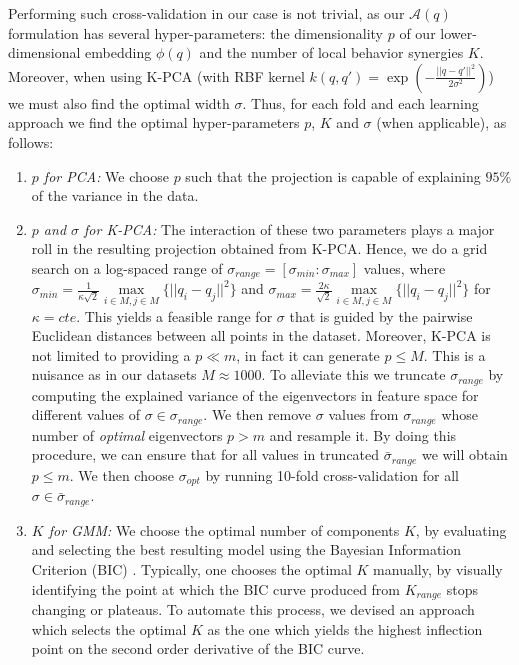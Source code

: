 \documentclass[letterpaper, 10 pt, journal, twoside, fleqn]{IEEEtran}
\begin{document}
Performing such cross-validation in our case is not trivial, as our $\mathcal{A}(q)$ formulation has several hyper-parameters: the dimensionality $p$ of our lower-dimensional embedding $\phi(q)$ and the number of local behavior synergies $K$. Moreover, when using K-PCA (with RBF kernel $k(q,q') = \exp(-\frac{||q-q'||^2}{2\sigma^2})$) we must also find the optimal width $\sigma$. Thus, for each fold and each learning approach we find the optimal hyper-parameters $p$, $K$ and $\sigma$ (when applicable), as follows:
\begin{enumerate}[leftmargin=*]
\item \textit{$p$ for PCA:} We choose $p$ such that the projection is capable of explaining $95\%$ of the variance in the data.
\item \textit{$p$ and $\sigma$ for K-PCA:} The interaction of these two parameters plays a major roll in the resulting projection obtained from K-PCA. Hence, we do a grid search on a log-spaced range of $\sigma_{range} = [\sigma_{min}:\sigma_{max}]$ values, where 
$\sigma_{min} = \frac{1}{\kappa\sqrt{2}} \underset{i \in M,j\in M}{\max}\{||q_i - q_j||^2\}$ and $\sigma_{max} = \frac{2\kappa}{\sqrt{2}} \underset{i \in M,j\in M}{\max}\{||q_i - q_j||^2\}$ for $\kappa = cte.$ This yields a feasible range for $\sigma$ that is guided by the pairwise Euclidean distances between all points in the dataset. Moreover, K-PCA is not limited to providing a $p \ll m$, in fact it can generate $p \le M$. This is a nuisance as in our datasets $M\approx1000$. To alleviate this we truncate $\sigma_{range}$ by computing the explained variance of the eigenvectors in feature space for different values of  $\sigma \in \sigma_{range}$. We then remove $\sigma$ values from $\sigma_{range}$ whose number of \textit{optimal} eigenvectors $p > m$ and resample it. By doing this procedure, we can ensure that for all values in truncated $\bar{\sigma}_{range}$ we will obtain $p \le m$. We then choose $\sigma_{opt}$ by running 10-fold cross-validation for all $\sigma \in \bar{\sigma}_{range}$. 
\item \textit{$K$ for GMM:} We choose the optimal number of components $K$, by evaluating and selecting the best resulting model using the Bayesian Information Criterion (BIC) \cite{Bishop:PRM:2006}. Typically, one chooses the optimal $K$ manually, by visually identifying the point at which the BIC curve produced from $K_{range}$ stops changing or plateaus. To automate this process, we devised an approach which selects the optimal $K$ as the one which yields the highest inflection point on the second order derivative of the BIC curve.
\end{enumerate}
\end{document}
